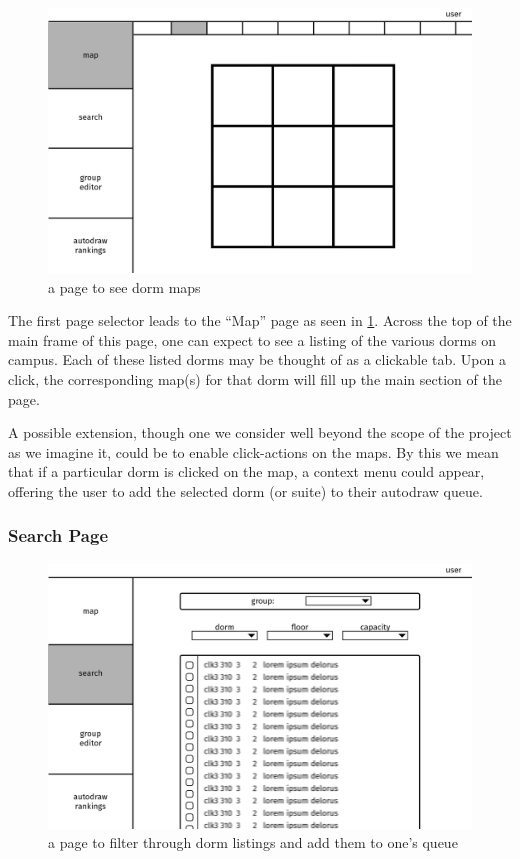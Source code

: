 \begin{figure} \centering
\includegraphics[scale=.15]{wireframe/map}
\caption{a page to see dorm maps}
\label{fig:wiremap}
\end{figure}

The first page selector leads to the ``Map'' page as seen in \cref{fig:wiremap}.
Across the top of the main frame of this page, one can expect to see a listing
of the various dorms on campus. Each of these listed dorms may be thought of as
a clickable tab. Upon a click, the corresponding map(s) for that dorm will fill
up the main section of the page.

A possible extension, though one we consider well beyond the scope of the
project as we imagine it, could be to enable click-actions on the maps. By this
we mean that if a particular dorm is clicked on the map, a context menu could
appear, offering the user to add the selected dorm (or suite) to their autodraw
queue.


\subsubsection{Search Page}
\begin{figure} \centering
\includegraphics[scale=.15]{wireframe/search}
\caption{a page to filter through dorm listings and add them to one's queue}
\label{fig:wiresearch}
\end{figure}

